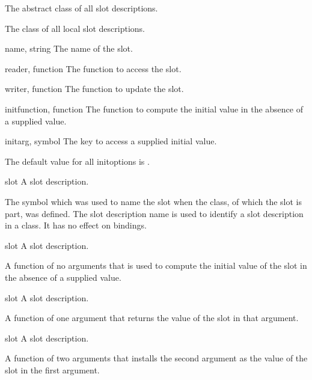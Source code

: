 %
\begin{optDefinition}

The abstract class of all slot descriptions.


The class of all local slot descriptions.
%
\begin{initoptions}
    \item[name, string] The name of the slot.%
    \item[reader, function] The function to access the slot.
    \item[writer, function] The function to update the slot.
    \item[initfunction, function] The function to compute the initial value in
    the absence of a supplied value.
    \item[initarg, symbol] The key to access a supplied initial value.
\end{initoptions}

The default value for all initoptions is \nil{}.

%
\begin{arguments}
    \item[slot] A slot description.
\end{arguments}
%
\result%
The symbol which was used to name the slot when the class, of which
the slot is part, was defined.
%
\remarks%
The slot description name is used to identify a slot description in a
class. It has no effect on bindings.

%
\begin{arguments}
    \item[slot] A slot description.
\end{arguments}
%
\result%
A function of no arguments that is used to compute the initial value of the
slot in the absence of a supplied value.

%
\begin{arguments}
    \item[slot] A slot description.
\end{arguments}
%
\result%
A function of one argument that returns the value of the slot
in that argument.

%
\begin{arguments}
    \item[slot] A slot description.
\end{arguments}
%
\result%
A function of two arguments that installs the second argument as the value of
the slot in the first argument.
\end{optDefinition}

